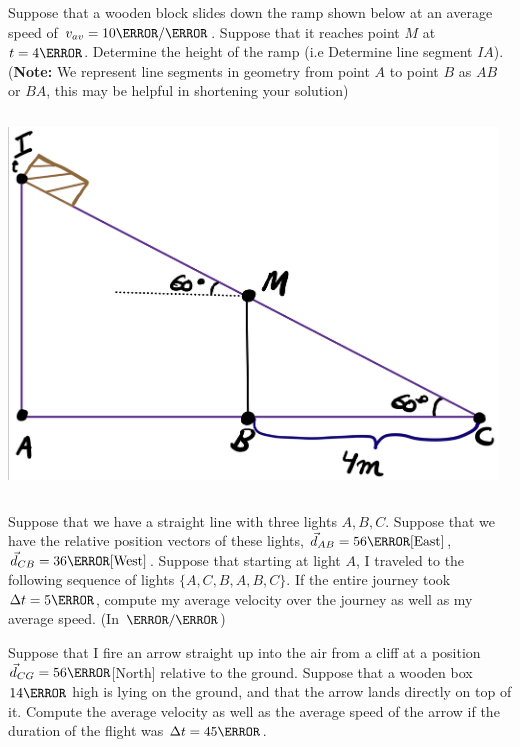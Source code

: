\documentclass[12pt]{article} %
\newcommand{\tx}[1]{\text{#1}}
\begin{document}
\begin{qstn}[8]
Suppose that a wooden block slides down the ramp shown below at an average speed of $v_{av} = 10 \m / \s$. Suppose that it reaches point $M$ at $t = 4\s$.  Determine the height of the ramp (i.e Determine line segment $IA$).\\ (\textbf{Note: }We represent line segments in geometry from point $A$ to point $B$ as $AB$ or $BA$, this may be helpful in shortening your solution)
\begin{center}
	\includegraphics[width=13cm, height=10cm]{ramp.jpg}
\end{center}

\end{qstn}


\begin{qstn}[9]
Suppose that we have a straight line with three lights $A,B,C$. Suppose that we have the relative position vectors of these lights, $\vec d_{AB} = 56\m\tx{[East]}$, $\vec d_{CB} = 36\m\tx{[West]}$. Suppose that starting at light $A$, I traveled to the following sequence of lights $\{A,C,B,A,B,C\}$. If the entire journey took $\Delta t = 5\m$, compute my average velocity over the journey as well as my average speed. (In $\m / \s$) 

\end{qstn}


\begin{qstn}[10]
Suppose that I fire an arrow straight up into the air from a cliff at a position $\vec d_{CG} = 56\m$[North] relative to the ground. Suppose that a wooden box $14\m$ high is lying on the ground, and that the arrow lands directly on top of it. Compute the average velocity as well as the average speed of the arrow if the duration of the flight was $\Delta t = 45\s$. 
\end{qstn}
\end{document}
